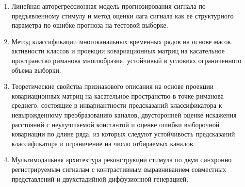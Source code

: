 {}
\begin{enumerate}[beginpenalty=10000]
    \item Линейная авторегрессионная модель прогнозирования сигнала по предъявленному стимулу и метод оценки лага сигнала как ее структурного параметра по ошибке прогноза на тестовой выборке.
    \item Метод классификации многоканальных временных рядов на основе масок активности классов и проекции ковариационных матриц на касательное пространство риманова многообразия, устойчивый в условиях ограниченного объема выборки.
    \item Теоретические свойства признакового описания на основе проекции ковариационных матриц на касательное пространство в точке риманова среднего, состоящие в инвариантности предсказаний классификатора к невырожденному преобразованию каналов, двусторонней оценке искажения расстояний с неулучшаемой константой и оценке ошибки выборочной ковариации по длине ряда, из которых следуют устойчивость предсказаний классификатора и ограничение на число отбираемых каналов.
    \item Мультимодальная архитектура реконструкции стимула по двум синхронно регистрируемым сигналам с контрастивным выравниванием совместных представлений и двухстадийной диффузионной генерацией.
\end{enumerate}

